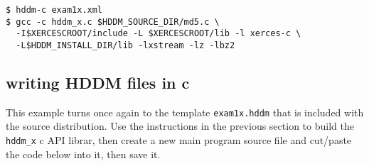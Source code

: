 \documentclass{revtex4}
\begin{document}
\vspace{0.5cm}
\begin{minipage}{12cm}
\begin{verbatim}
$ hddm-c exam1x.xml
$ gcc -c hddm_x.c $HDDM_SOURCE_DIR/md5.c \
  -I$XERCESCROOT/include -L $XERCESCROOT/lib -l xerces-c \
  -L$HDDM_INSTALL_DIR/lib -lxstream -lz -lbz2
\end{verbatim}
\end{minipage}
\vspace{0.5cm}

\subsection{writing HDDM files in c}

This example turns once again to the template \texttt{exam1x.hddm} that is included
with the source distribution. Use the instructions in the previous section to build
the \texttt{hddm\_x} c API librar, then create a new main program source file and
cut/paste the code below into it, then save it.
\end{document}
